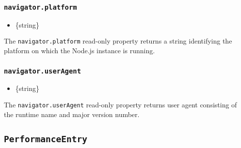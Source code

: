 \subsubsection{\texorpdfstring{\texttt{navigator.platform}}{navigator.platform}}\label{navigator.platform}

\begin{itemize}
\tightlist
\item
  \{string\}
\end{itemize}

The \texttt{navigator.platform} read-only property returns a string
identifying the platform on which the Node.js instance is running.

\begin{Shaded}
\begin{Highlighting}[]
\NormalTok{(}\SpecialCharTok{$\{}\SpecialCharTok{\}}\VerbatimStringTok{\textasciigrave{}}\NormalTok{)}\OperatorTok{;}
\end{Highlighting}
\end{Shaded}

\subsubsection{\texorpdfstring{\texttt{navigator.userAgent}}{navigator.userAgent}}\label{navigator.useragent}

\begin{itemize}
\tightlist
\item
  \{string\}
\end{itemize}

The \texttt{navigator.userAgent} read-only property returns user agent
consisting of the runtime name and major version number.

\begin{Shaded}
\begin{Highlighting}[]
\NormalTok{(}\SpecialCharTok{$\{}\SpecialCharTok{\}}\VerbatimStringTok{\textasciigrave{}}\NormalTok{)}\OperatorTok{;} 
\end{Highlighting}
\end{Shaded}

\subsection{\texorpdfstring{\texttt{PerformanceEntry}}{PerformanceEntry}}\label{performanceentry}

